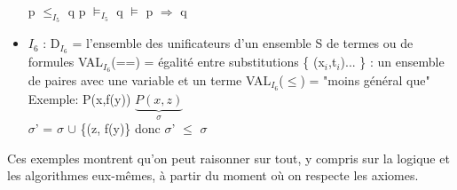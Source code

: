 \begin{itemize}
p $\leq_{I_{5}}$ q   \hspace{1.5cm} p $\models_{I_{5}}$ q \hspace{1.5cm} $\models$ p $\Rightarrow$ q
\item \underline{$I_{6}$} : D$_{I_{6}}$ = l'ensemble des unificateurs d'un ensemble S de termes ou de formules
VAL$_{I_{6}}$(==) = égalité entre substitutions \{ (x$_{i}$,t$_{i}$)... \} : un ensemble de paires avec une variable et un terme VAL$_{I_{6}}$($\leq$) = "moins général que"\\
\newline
Exemple: P(x,f(y)) \hspace{1cm} $\underbrace{P(x,z)}_{\sigma}$\\
$\sigma$' = $\sigma$ $\cup$ \{(z, f(y)\} donc 
$\sigma$' $\leq$ $\sigma$\\
\end{itemize}
Ces exemples montrent qu'on peut raisonner sur tout, y compris sur la logique et les algorithmes eux-mêmes, à partir du moment où on respecte les axiomes.
